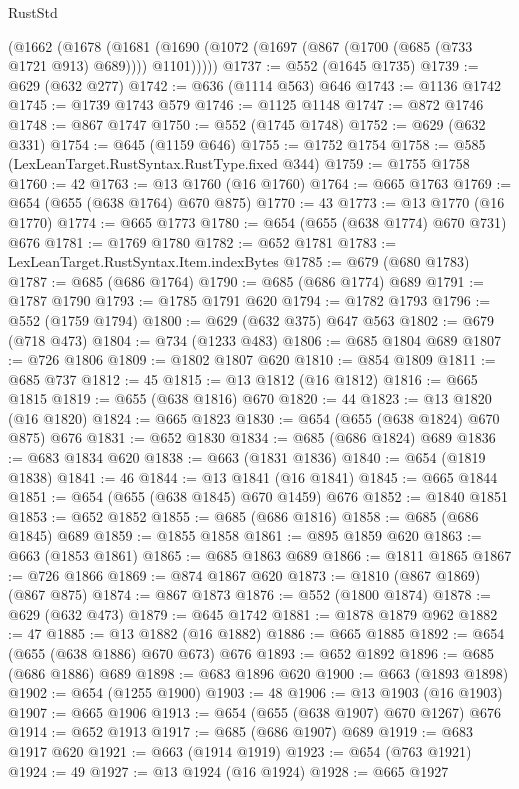 \begin{lexlean}{RustStd}
\begin{coremodule}
    (@1662
      (@1678 (@1681 (@1690 (@1072 (@1697 (@867 (@1700 (@685 (@733 @1721 @913) @689)))) @1101)))))
@1737 := @552 (@1645 @1735)
@1739 := @629 (@632 @277)
@1742 := @636 (@1114 @563) @646
@1743 := @1136 @1742
@1745 := @1739 @1743 @579
@1746 := @1125 @1148
@1747 := @872 @1746
@1748 := @867 @1747
@1750 := @552 (@1745 @1748)
@1752 := @629 (@632 @331)
@1754 := @645 (@1159 @646)
@1755 := @1752 @1754
@1758 := @585 (LexLeanTarget.RustSyntax.RustType.fixed @344)
@1759 := @1755 @1758
@1760 := 42
@1763 := @13 @1760 (@16 @1760)
@1764 := @665 @1763
@1769 := @654 (@655 (@638 @1764) @670 @875)
@1770 := 43
@1773 := @13 @1770 (@16 @1770)
@1774 := @665 @1773
@1780 := @654 (@655 (@638 @1774) @670 @731) @676
@1781 := @1769 @1780
@1782 := @652 @1781
@1783 := LexLeanTarget.RustSyntax.Item.indexBytes
@1785 := @679 (@680 @1783)
@1787 := @685 (@686 @1764)
@1790 := @685 (@686 @1774) @689
@1791 := @1787 @1790
@1793 := @1785 @1791 @620
@1794 := @1782 @1793
@1796 := @552 (@1759 @1794)
@1800 := @629 (@632 @375) @647 @563
@1802 := @679 (@718 @473)
@1804 := @734 (@1233 @483)
@1806 := @685 @1804 @689
@1807 := @726 @1806
@1809 := @1802 @1807 @620
@1810 := @854 @1809
@1811 := @685 @737
@1812 := 45
@1815 := @13 @1812 (@16 @1812)
@1816 := @665 @1815
@1819 := @655 (@638 @1816) @670
@1820 := 44
@1823 := @13 @1820 (@16 @1820)
@1824 := @665 @1823
@1830 := @654 (@655 (@638 @1824) @670 @875) @676
@1831 := @652 @1830
@1834 := @685 (@686 @1824) @689
@1836 := @683 @1834 @620
@1838 := @663 (@1831 @1836)
@1840 := @654 (@1819 @1838)
@1841 := 46
@1844 := @13 @1841 (@16 @1841)
@1845 := @665 @1844
@1851 := @654 (@655 (@638 @1845) @670 @1459) @676
@1852 := @1840 @1851
@1853 := @652 @1852
@1855 := @685 (@686 @1816)
@1858 := @685 (@686 @1845) @689
@1859 := @1855 @1858
@1861 := @895 @1859 @620
@1863 := @663 (@1853 @1861)
@1865 := @685 @1863 @689
@1866 := @1811 @1865
@1867 := @726 @1866
@1869 := @874 @1867 @620
@1873 := @1810 (@867 @1869) (@867 @875)
@1874 := @867 @1873
@1876 := @552 (@1800 @1874)
@1878 := @629 (@632 @473)
@1879 := @645 @1742
@1881 := @1878 @1879 @962
@1882 := 47
@1885 := @13 @1882 (@16 @1882)
@1886 := @665 @1885
@1892 := @654 (@655 (@638 @1886) @670 @673) @676
@1893 := @652 @1892
@1896 := @685 (@686 @1886) @689
@1898 := @683 @1896 @620
@1900 := @663 (@1893 @1898)
@1902 := @654 (@1255 @1900)
@1903 := 48
@1906 := @13 @1903 (@16 @1903)
@1907 := @665 @1906
@1913 := @654 (@655 (@638 @1907) @670 @1267) @676
@1914 := @652 @1913
@1917 := @685 (@686 @1907) @689
@1919 := @683 @1917 @620
@1921 := @663 (@1914 @1919)
@1923 := @654 (@763 @1921)
@1924 := 49
@1927 := @13 @1924 (@16 @1924)
@1928 := @665 @1927

\end{coremodule}
\end{lexlean}
